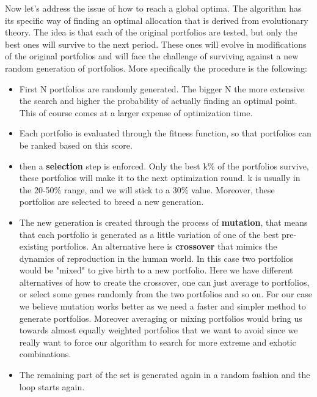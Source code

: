 
Now let's address the issue of how to reach a global optima. The algorithm has its specific way of finding an optimal allocation that is derived from evolutionary theory. The idea is that each of the original portfolios are tested, but only the best ones will survive to the next period. These ones will evolve in modifications of the original portfolios and will face the challenge of surviving against a new random generation of portfolios. More specifically the procedure is the following:

\begin{itemize}
	\item First N portfolios are randomly generated. The bigger N the more extensive the search and higher the probability of actually finding an optimal point. This of course comes at a larger expense of optimization time.
	\item Each portfolio is evaluated through the fitness function, so that portfolios can be ranked based on this score.
	\item then a \textbf{selection} step is enforced. Only the best k\% of the portfolios survive, these portfolios will make it to the next optimization round. k is usually in the 20-50\% range, and we will stick to a 30\% value. Moreover, these portfolios are selected to breed a new generation.
	\item The new generation is created through the process of \textbf{mutation}, that means that each portfolio is generated as a little variation of one of the best pre-existing portfolios. An alternative here is \textbf{crossover} that mimics the dynamics of reproduction in the human world. In this case two portfolios would be "mixed" to give birth to a new portfolio. Here we have different alternatives of how to create the crossover, one can just average to portfolios, or select some genes randomly from the two portfolios and so on. For our case we believe mutation works better as we need a faster and simpler method to generate portfolios. Moreover averaging or mixing portfolios would bring us towards almost equally weighted portfolios that we want to avoid since we really want to force our algorithm to search for more extreme and exhotic combinations. 
	\item The remaining part of the set is generated again in a random fashion and the loop starts again.
\end{itemize}

